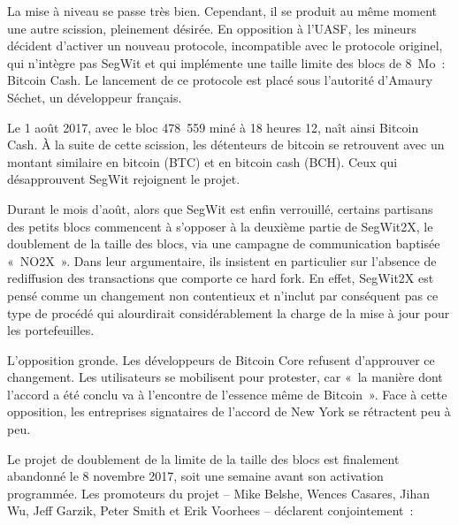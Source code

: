 La mise à niveau se passe très bien. Cependant, il se produit au même moment une autre scission, pleinement désirée. En opposition à l'UASF, les mineurs décident d'activer un nouveau protocole, incompatible avec le protocole originel, qui n'intègre pas SegWit et qui implémente une taille limite des blocs de 8~Mo~: Bitcoin Cash. Le lancement de ce protocole est placé sous l'autorité d'Amaury Séchet, un développeur français.

Le 1\ier{} août 2017, avec le bloc 478~559 miné à 18 heures 12, naît ainsi Bitcoin Cash. À la suite de cette scission, les détenteurs de bitcoin se retrouvent avec un montant similaire en bitcoin (BTC) et en bitcoin cash (BCH). Ceux qui désapprouvent SegWit rejoignent le projet.

Durant le mois d'août, alors que SegWit est enfin verrouillé, certains partisans des petits blocs commencent à s'opposer à la deuxième partie de SegWit2X, le doublement de la taille des blocs, via une campagne de communication baptisée «~NO2X~». Dans leur argumentaire, ils insistent en particulier sur l'absence de rediffusion des transactions que comporte ce hard fork. En effet, SegWit2X est pensé comme un changement non contentieux et n'inclut par conséquent pas ce type de procédé qui alourdirait considérablement la charge de la mise à jour pour les portefeuilles.

L'opposition gronde. Les développeurs de Bitcoin Core refusent d'approuver ce changement. Les utilisateurs se mobilisent pour protester, car «~la manière dont l'accord a été conclu va à l'encontre de l'essence même de Bitcoin~». Face à cette opposition, les entreprises signataires de l'accord de New York se rétractent peu à peu.

Le projet de doublement de la limite de la taille des blocs est finalement abandonné le 8 novembre 2017, soit une semaine avant son activation programmée. Les promoteurs du projet -- Mike Belshe, Wences Casares, Jihan Wu, Jeff Garzik, Peter Smith et Erik Voorhees -- déclarent conjointement~:

